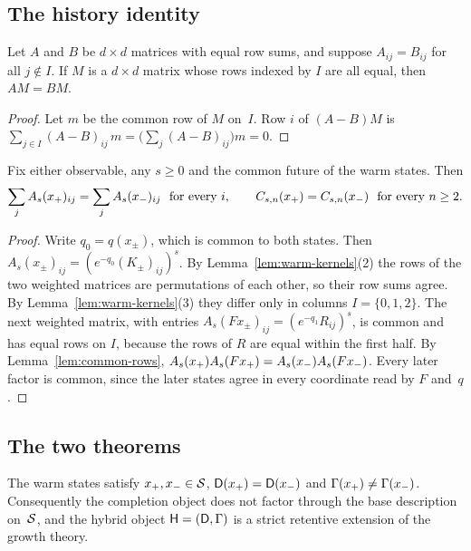 \subsection{The history identity}

\begin{lemma}\label{lem:common-rows}
Let $A$ and $B$ be $d\times d$ matrices with equal row sums, and suppose $A_{ij}=B_{ij}$ for all $j\notin I$. If $M$ is a $d\times d$ matrix whose rows indexed by $I$ are all equal, then $AM=BM$.
\end{lemma}

\begin{proof}
Let $m$ be the common row of $M$ on~$I$. Row $i$ of $(A-B)M$ is $\sum_{j\in I}(A-B)_{ij}\,m=\bigl(\sum_j(A-B)_{ij}\bigr)m=0$.
\end{proof}

\begin{proposition}\label{prop:history-identity}
Fix either observable, any $s\ge0$ and the common future of the warm states. Then
\[
\sum_j A_s(x_{+})_{ij}=\sum_j A_s(x_{-})_{ij}\ \text{ for every } i,
\qquad
C_{s,n}(x_{+})=C_{s,n}(x_{-})\ \text{ for every } n\ge2.
\]
\end{proposition}

\begin{proof}
Write $q_0=q(x_\pm)$, which is common to both states. Then $A_s(x_\pm)_{ij}=(e^{-q_0}(K_\pm)_{ij})^s$. By Lemma~\ref{lem:warm-kernels}(2) the rows of the two weighted matrices are permutations of each other, so their row sums agree. By Lemma~\ref{lem:warm-kernels}(3) they differ only in columns $I=\{0,1,2\}$. The next weighted matrix, with entries $A_s(Fx_\pm)_{ij}=(e^{-q_1}R_{ij})^s$, is common and has equal rows on $I$, because the rows of $R$ are equal within the first half. By Lemma~\ref{lem:common-rows}, $A_s(x_{+})A_s(Fx_{+})=A_s(x_{-})A_s(Fx_{-})$. Every later factor is common, since the later states agree in every coordinate read by $F$ and~$q$.
\end{proof}

\subsection{The two theorems}

\begin{theorem}\label{thm:strict-extension}
The warm states satisfy $x_{+},x_{-}\in\mathcal{S}$, $\mathsf{D}(x_{+})=\mathsf{D}(x_{-})$ and $\Gamma(x_{+})\ne\Gamma(x_{-})$. Consequently the completion object does not factor through the base description on~$\mathcal{S}$, and the hybrid object $\mathsf{H}=(\mathsf{D},\Gamma)$ is a strict retentive extension of the growth theory.
\end{theorem}

